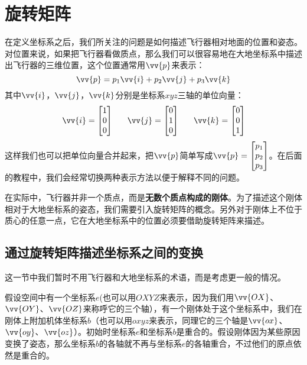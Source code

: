 \documentclass[11pt]{article}
\begin{document}
\section{旋转矩阵}
在定义坐标系之后，我们所关注的问题是如何描述飞行器相对地面的位置和姿态。对位置来说，如果把飞行器看做质点，那么我们可以很容易地在大地坐标系中描述出飞行器的三维位置，这个位置通常用$\vv{p}$来表示：
$$
\vv{p} = p_1\vv{i}+p_2\vv{j}+p_3\vv{k}
$$
其中$\vv{i}$，$\vv{j}$，$\vv{k}$分别是坐标系$xyz$三轴的单位向量：
$$
\vv{i} = \begin{bmatrix}
1\\0\\0
\end{bmatrix}\ \ \ \ \ 
\vv{j} = \begin{bmatrix}
0\\1\\0
\end{bmatrix}\ \ \ \ \ 
\vv{k} = \begin{bmatrix}
0\\0\\1
\end{bmatrix}
$$
这样我们也可以把单位向量合并起来，把$\vv{p}$简单写成$\vv{p} = \begin{bmatrix}
p_1\\p_2\\p_3
\end{bmatrix}$。在后面的教程中，我们会经常切换两种表示方法以便于解释不同的问题。

在实际中，飞行器并非一个质点，而是\textbf{无数个质点构成的刚体}。为了描述这个刚体相对于大地坐标系的姿态，我们需要引入旋转矩阵的概念。另外对于刚体上不位于质心的任意一点，它在大地坐标系中的位置必须要借助旋转矩阵来描述。
\subsection{通过旋转矩阵描述坐标系之间的变换}
这一节中我们暂时不用飞行器和大地坐标系的术语，而是考虑更一般的情况。

假设空间中有一个坐标系$e$(也可以用$OXYZ$来表示，因为我们用$\vv{OX}$、$\vv{OY}$、$\vv{OZ}$来称呼它的三个轴），有一个刚体处于这个坐标系中，我们在刚体上附加机体坐标系$b$（也可以用$oxyz$来表示，同理它的三个轴是$\vv{ox}$、$\vv{oy}$、$\vv{oz}$）。初始时坐标系$e$和坐标系$b$是重合的。假设刚体因为某些原因变换了姿态，那么坐标系$b$的各轴就不再与坐标系$e$的各轴重合，不过他们的原点依然是重合的。
\end{document}
